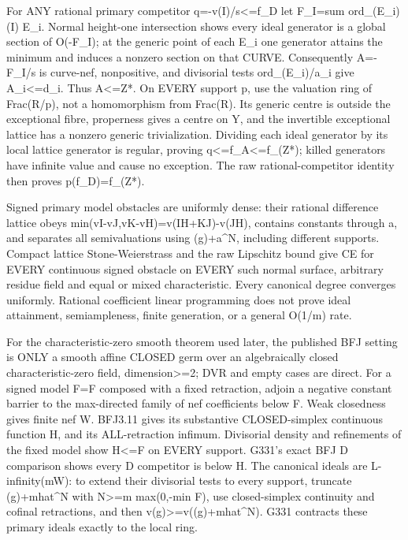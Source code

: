 For ANY rational primary competitor q=-v(I)/s\textless{}=f\_D let F\_I=sum ord\_(E\_i)(I) E\_i. Normal height-one intersection shows every ideal generator is a global section of O(-F\_I); at the generic point of each E\_i one generator attains the minimum and induces a nonzero section on that CURVE. Consequently A=-F\_I/s is curve-nef, nonpositive, and divisorial tests ord\_(E\_i)/a\_i give A\_i\textless{}=d\_i. Thus A\textless{}=Z*. On EVERY support p, use the valuation ring of Frac(R/p), not a homomorphism from Frac(R). Its generic centre is outside the exceptional fibre, properness gives a centre on Y, and the invertible exceptional lattice has a nonzero generic trivialization. Dividing each ideal generator by its local lattice generator is regular, proving q\textless{}=f\_A\textless{}=f\_(Z*); killed generators have infinite value and cause no exception. The raw rational-competitor identity then proves p(f\_D)=f\_(Z*).

Signed primary model obstacles are uniformly dense: their rational difference lattice obeys min(vI-vJ,vK-vH)=v(IH+KJ)-v(JH), contains constants through a, and separates all semivaluations using (g)+a\textasciicircum{}N, including different supports. Compact lattice Stone-Weierstrass and the raw Lipschitz bound give CE for EVERY continuous signed obstacle on EVERY such normal surface, arbitrary residue field and equal or mixed characteristic. Every canonical degree converges uniformly. Rational coefficient linear programming does not prove ideal attainment, semiampleness, finite generation, or a general O(1/m) rate.

For the characteristic-zero smooth theorem used later, the published BFJ setting is ONLY a smooth affine CLOSED germ over an algebraically closed characteristic-zero field, dimension\textgreater{}=2; DVR and empty cases are direct. For a signed model F=F composed with a fixed retraction, adjoin a negative constant barrier to the max-directed family of nef coefficients below F. Weak closedness gives finite nef W. BFJ3.11 gives its substantive CLOSED-simplex continuous function H, and its ALL-retraction infimum. Divisorial density and refinements of the fixed model show H\textless{}=F on EVERY support. G331's exact BFJ D comparison shows every D competitor is below H. The canonical ideals are L-infinity(mW): to extend their divisorial tests to every support, truncate (g)+mhat\textasciicircum{}N with N\textgreater{}=m max(0,-min F), use closed-simplex continuity and cofinal retractions, and then v(g)\textgreater{}=v((g)+mhat\textasciicircum{}N). G331 contracts these primary ideals exactly to the local ring.

